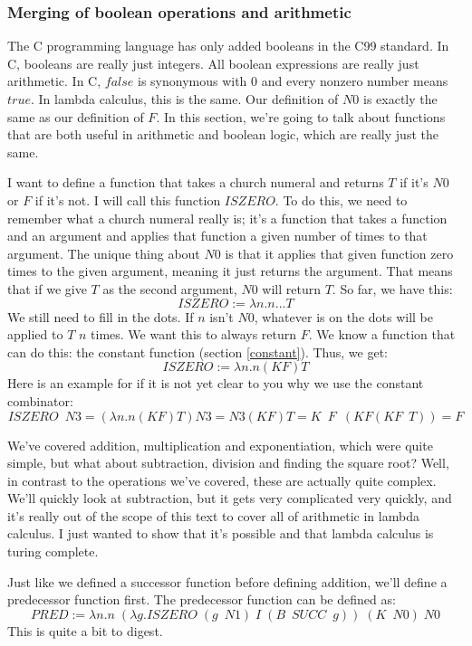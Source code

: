 \documentclass[11pt]{article}
\begin{document}
\subsubsection{Merging of boolean operations and arithmetic}

The C programming language has only added booleans in the C99 standard. In C,
booleans are really just integers. All boolean expressions are really just
arithmetic. In C, \(false\) is synonymous with \(0\) and every nonzero number
means \(true\). In lambda calculus, this is the same. Our definition of \(N0\)
is exactly the same as our definition of \(F\). In this section, we're going to
talk about functions that are both useful in arithmetic and boolean logic,
which are really just the same.

I want to define a function that takes a church numeral and returns \(T\) if
it's \(N0\) or \(F\) if it's not. I will call this function \(ISZERO\). To do
this, we need to remember what a church numeral really is; it's a function that
takes a function and an argument and applies that function a given number of
times to that argument. The unique thing about \(N0\) is that it applies that
given function zero times to the given argument, meaning it just returns the
argument. That means that if we give \(T\) as the second argument, \(N0\) will
return \(T\). So far, we have this:
\[ISZERO:=\lambda n.n...T\]
We still need to fill in the dots. If \(n\) isn't \(N0\), whatever is on the
dots will be applied to \(T\) \(n\) times. We want this to always return \(F\).
We know a function that can do this: the constant function (section
\ref{constant}). Thus, we get:
\[ISZERO:=\lambda n.n(KF)T\]
Here is an example for if it is not yet clear to you why we use the constant
combinator:
\[ISZERO\enspace N3=(\lambda n.n(KF)T)N3=N3(KF)T=K\enspace F\enspace (KF(KF\enspace T))=F\]

We've covered addition, multiplication and exponentiation, which were quite
simple, but what about subtraction, division and finding the square root? Well,
in contrast to the operations we've covered, these are actually quite complex.
We'll quickly look at subtraction, but it gets very complicated very quickly,
and it's really out of the scope of this text to cover all of arithmetic in
lambda calculus. I just wanted to show that it's possible and that lambda
calculus is turing complete.

Just like we defined a successor function before defining addition, we'll
define a predecessor function first. The predecessor function can be defined
as:
\[PRED:=\lambda n.n\;(\lambda g.ISZERO\;(g\enspace N1)\;I\;(B\enspace SUCC\enspace g))\;(K\enspace N0)\;N0\]
This is quite a bit to digest.
\end{document}
